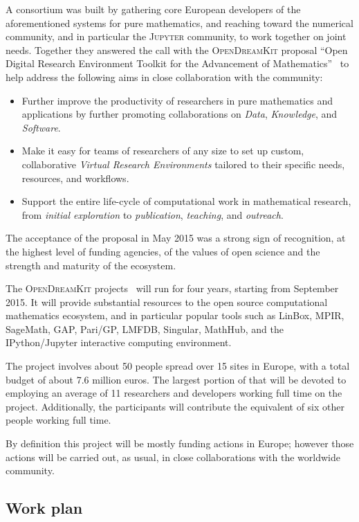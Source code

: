 \documentclass{llncs}
\newcommand{\software}[1]{\textsc{#1}\xspace}
\newcommand{\Jupyter}{\software{Jupyter}}
\newcommand{\ODK}{\software{OpenDreamKit}}
\begin{document}
A consortium was built by gathering core European developers of the
aforementioned systems for pure mathematics, and reaching toward the
numerical community, and in particular the \Jupyter community, to work
together on joint needs.
%
Together they answered the call with the \ODK proposal ``Open
Digital Research Environment Toolkit for the Advancement of
Mathematics''~\cite{OpenDreamKit:on} to help address the following aims in close
collaboration with the community:

\begin{itemize}
\item Further improve the productivity of researchers in pure mathematics and applications
  by further promoting collaborations on \emph{Data}, \emph{Knowledge}, and
  \emph{Software}.
\item Make it easy for teams of researchers of any size to set up custom, collaborative
  \emph{Virtual Research Environments} tailored to their specific needs, resources, and
  workflows.
\item Support the entire life-cycle of computational work in mathematical research, from
  \emph{initial exploration} to \emph{publication}, \emph{teaching}, and \emph{outreach}.
\end{itemize}

The acceptance of the proposal in May 2015 was a strong sign of
recognition, at the highest level of funding agencies, of the values
of open science and the strength and maturity of the ecosystem.

The \ODK projects~\cite{ODKproposal:on} will run for four years, starting from September
2015. It will provide substantial resources to the open source computational mathematics
ecosystem, and in particular popular tools such as LinBox, MPIR, SageMath, GAP, Pari/GP,
LMFDB, Singular, MathHub, and the IPython/Jupyter interactive computing environment.

The project involves about 50 people spread over 15 sites in Europe,
with a total budget of about 7.6 million euros. The largest portion of
that will be devoted to employing an average of 11 researchers and
developers working full time on the project. Additionally, the
participants will contribute the equivalent of six other people
working full time.

By definition this project will be mostly funding actions in Europe;
however those actions will be carried out, as usual, in close
collaborations with the worldwide community.

\subsection{Work plan}
\end{document}
